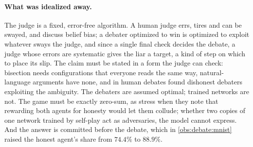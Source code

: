 \begin{refsection}
\paragraph{What was idealized away.} The judge is a fixed, error-free algorithm. A human judge errs, tires and can be swayed, and \textcite[\S5.1]{IrvingEtAl2018} discuss belief bias; a debater optimized to win is optimized to exploit whatever sways the judge, and since a single final check decides the debate, a judge whose errors are systematic gives the liar a target, a kind of step on which to place its slip. The claim must be stated in a form the judge can check: bisection needs configurations that everyone reads the same way, natural-language arguments have none, and in human debates \textcite{BarnesChristiano2020} found dishonest debaters exploiting the ambiguity. The debaters are assumed optimal; trained networks are not. The game must be exactly zero-sum, as \textcite[\S5.10]{IrvingEtAl2018} stress when they note that rewarding both agents for honesty would let them collude; whether two copies of one network trained by self-play act as adversaries, the model cannot express. And the answer is committed before the debate, which in \cref{obs:debate:mnist} raised the honest agent's share from $74.4\%$ to $88.9\%$.


\end{refsection}
